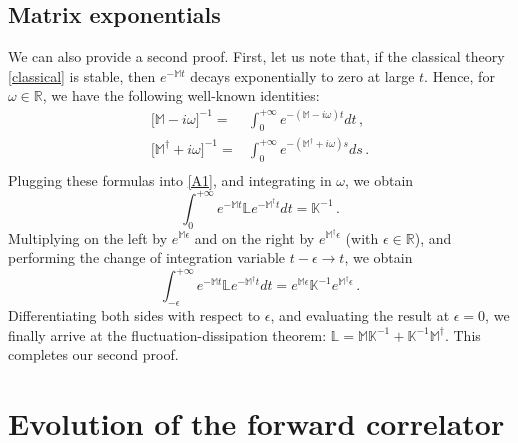 \documentclass[a4paper, amsfonts, amssymb, amsmath, reprint, showkeys, nofootinbib, twoside,notitlepage,onecolumn]{revtex4-2}
\newcommand{\Ma}{{\mathbb{M}}}
\newcommand{\Ka}{{\mathbb{K}}}
\newcommand{\La}{{\mathbb{L}}}
\theoremstyle{definition}
\begin{document}
\subsection{Matrix exponentials}

We can also provide a second proof. First, let us note that, if the classical theory \eqref{classical} is stable, then $e^{-\Ma t}$ decays exponentially to zero at large $t$. Hence, for $\omega\in \mathbb{R}$, we have the following well-known identities:
\begin{equation}\label{freesbone}
   \begin{split}
\big[\Ma{-}i\omega\big]^{-1} ={}&  \int_0^{+\infty} e^{-(\Ma-i\omega)t}dt \, ,\\
\big[\Ma^\dagger{+}i\omega\big]^{-1} ={}&  \int_0^{+\infty} e^{-(\Ma^\dagger+i\omega)s}ds \, .\\
   \end{split}
\end{equation}
Plugging these formulas into \eqref{A1}, and integrating in $\omega$, we obtain
\begin{equation}
    \int_0^{+\infty} e^{-\Ma t} \mathbb{L}e^{-\Ma^\dagger t} dt = \Ka^{-1} \, .
\end{equation}
Multiplying on the left by $e^{\Ma \epsilon}$ and on the right by $e^{\Ma^\dagger \epsilon}$ (with $\epsilon \in \mathbb{R}$), and performing the change of integration variable $t-\epsilon \rightarrow t$, we obtain
\begin{equation}
    \int_{-\epsilon}^{+\infty} e^{-\Ma t} \mathbb{L}e^{-\Ma^\dagger t} dt = e^{\Ma \epsilon}\Ka^{-1}e^{\Ma^\dagger \epsilon} \, .
\end{equation}
Differentiating both sides with respect to $\epsilon$, and evaluating the result at $\epsilon=0$, we finally arrive at the fluctuation-dissipation theorem: $\La = \Ma \Ka^{-1}+\Ka^{-1}\Ma^\dagger$. This completes our second proof.


\section{Evolution of the forward correlator}\label{freestreaming}
\end{document}

